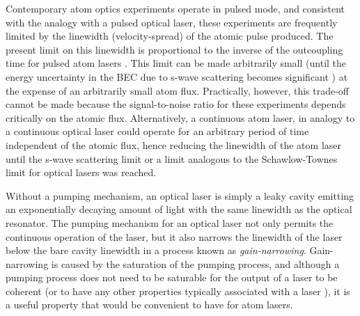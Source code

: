 Contemporary atom optics experiments operate in pulsed mode, and consistent with the analogy with a pulsed optical laser, these experiments are frequently limited by the linewidth (velocity-spread) of the atomic pulse produced. The present limit on this linewidth is proportional to the inverse of the outcoupling time for pulsed atom lasers \cite{Johnsson:2007}.  This limit can be made arbitrarily small (until the energy uncertainty in the BEC due to s-wave scattering becomes significant \cite{Johnsson:2007a}) at the expense of an arbitrarily small atom flux.  Practically, however, this trade-off cannot be made because the signal-to-noise ratio for these experiments depends critically on the atomic flux.  Alternatively, a continuous atom laser, in analogy to a continuous optical laser could operate for an arbitrary period of time independent of the atomic flux, hence reducing the linewidth of the atom laser until the s-wave scattering limit \cite{Johnsson:2007a} or a limit analogous to the Schawlow-Townes limit for optical lasers \cite{Schawlow:1958} was reached.


Without a pumping mechanism, an optical laser is simply a leaky cavity emitting an exponentially decaying amount of light with the same linewidth as the optical resonator.  The pumping mechanism for an optical laser not only permits the continuous operation of the laser, but it also narrows the linewidth of the laser below the bare cavity linewidth in a process known as \emph{gain-narrowing}. Gain-narrowing is caused by the saturation of the pumping process, and although a pumping process does not need to be saturable for the output of a laser to be coherent (or to have any other properties typically associated with a laser \cite{Wiseman:1997ba}), it is a useful property that would be convenient to have for atom lasers.


